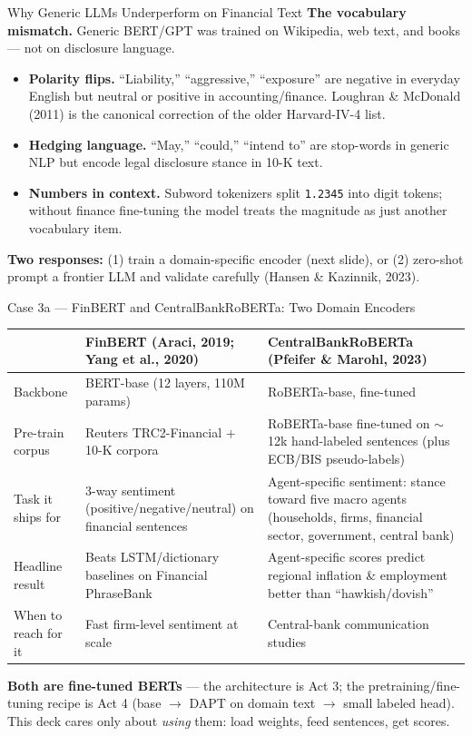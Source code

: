 \begin{frame}{Why Generic LLMs Underperform on Financial Text}
\textbf{The vocabulary mismatch.} Generic BERT/GPT was trained on Wikipedia, web text, and books --- not on disclosure language.

\medskip
\begin{itemize}
  \item \textbf{Polarity flips.} ``Liability,'' ``aggressive,'' ``exposure'' are negative in everyday English but neutral or positive in accounting/finance. Loughran \& McDonald (2011) is the canonical correction of the older Harvard-IV-4 list.
  \medskip
  \item \textbf{Hedging language.} ``May,'' ``could,'' ``intend to'' are stop-words in generic NLP but encode legal disclosure stance in 10-K text.
  \medskip
  \item \textbf{Numbers in context.} Subword tokenizers split \texttt{1.2345} into digit tokens; without finance fine-tuning the model treats the magnitude as just another vocabulary item.
\end{itemize}

\medskip
\textbf{Two responses:} (1) train a domain-specific encoder (next slide), or (2) zero-shot prompt a frontier LLM and validate carefully (Hansen \& Kazinnik, 2023).
\end{frame}

\begin{frame}{Case 3a --- FinBERT and CentralBankRoBERTa: Two Domain Encoders}
\begin{center}
\renewcommand{\arraystretch}{1.25}
\footnotesize
\begin{tabular}{|p{2.6cm}|p{4.0cm}|p{6.4cm}|}
\hline
& \textbf{FinBERT} (Araci, 2019; Yang et al., 2020) & \textbf{CentralBankRoBERTa} (Pfeifer \& Marohl, 2023) \\ \hline
Backbone & BERT-base (12 layers, 110M params) & RoBERTa-base, fine-tuned \\ \hline
Pre-train corpus & Reuters TRC2-Financial + 10-K corpora & RoBERTa-base fine-tuned on $\sim$12k hand-labeled sentences (plus ECB/BIS pseudo-labels) \\ \hline
Task it ships for & 3-way sentiment (positive/negative/neutral) on financial sentences & Agent-specific sentiment: stance toward five macro agents (households, firms, financial sector, government, central bank) \\ \hline
Headline result & Beats LSTM/dictionary baselines on Financial PhraseBank & Agent-specific scores predict regional inflation \& employment better than ``hawkish/dovish'' \\ \hline
When to reach for it & Fast firm-level sentiment at scale & Central-bank communication studies \\ \hline
\end{tabular}
\end{center}

\medskip
\textbf{Both are fine-tuned BERTs} --- the architecture is Act 3; the pretraining/fine-tuning recipe is Act 4 (base $\to$ DAPT on domain text $\to$ small labeled head). This deck cares only about \emph{using} them: load weights, feed sentences, get scores.
\end{frame}

